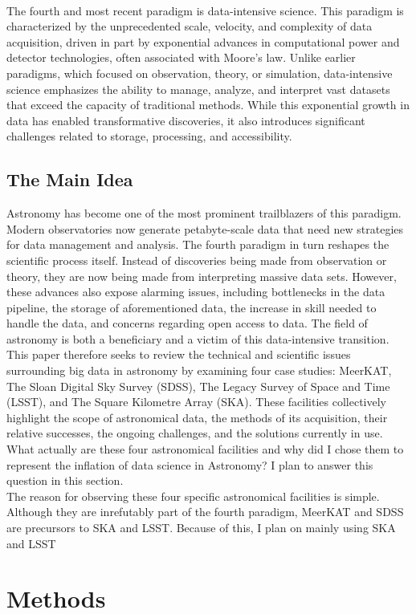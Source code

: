 \documentclass[manuscript,linenumbers,longauthor]{aastex631}
\begin{document}
\\\hspace*{2em}The fourth and most recent paradigm is data-intensive science. This paradigm is characterized by the unprecedented scale, velocity, and complexity of data acquisition, driven in part by exponential advances in computational power and detector technologies, often associated with Moore's law. Unlike earlier paradigms, which focused on observation, theory, or simulation, data-intensive science emphasizes the ability to manage, analyze, and interpret vast datasets that exceed the capacity of traditional methods. While this exponential growth in data has enabled transformative discoveries, it also introduces significant challenges related to storage, processing, and accessibility. 
\subsection{The Main Idea}
\hspace*{2em}Astronomy has become one of the most prominent trailblazers of this paradigm. Modern observatories now generate petabyte-scale data that need new strategies for data management and analysis. The fourth paradigm in turn reshapes the scientific process itself. Instead of discoveries being made from observation or theory, they are now being made from interpreting massive data sets. However, these advances also expose alarming issues, including bottlenecks in the data pipeline, the storage of aforementioned data, the increase in skill needed to handle the data, and concerns regarding open access to data. The field of astronomy is both a beneficiary and a victim of this data-intensive transition. This paper therefore seeks to review the technical and scientific issues surrounding big data in astronomy by examining four case studies: MeerKAT, The Sloan Digital Sky Survey (SDSS), The Legacy Survey of Space and Time (LSST), and The Square Kilometre Array (SKA). These facilities collectively highlight the scope of astronomical data, the methods of its acquisition, their relative successes, the ongoing challenges, and the solutions currently in use.
\\ \hspace*{2em} What actually are these four astronomical facilities and why did I chose them to represent the inflation of data science in Astronomy? I plan to answer this question in this section.
\\ \hspace*{2em}The reason for observing these four specific astronomical facilities is simple. Although they are inrefutably part of the fourth paradigm, MeerKAT and SDSS are precursors to SKA and LSST. Because of this, I plan on mainly using SKA and LSST 
\\ 
\section{Methods}


\end{document}
